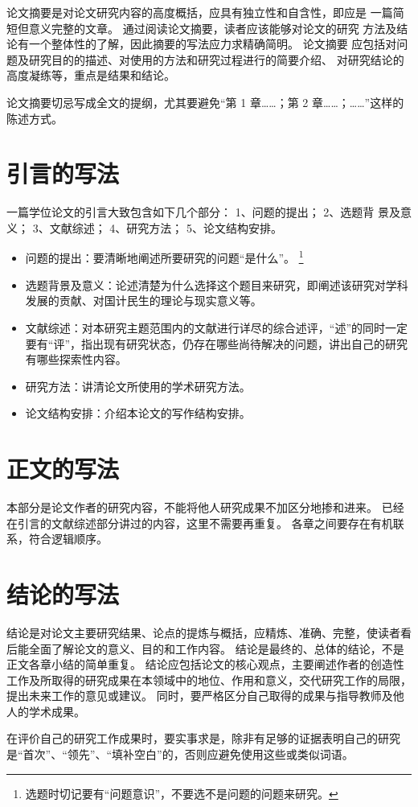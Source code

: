 论文摘要是对论文研究内容的高度概括，应具有独立性和自含性，即应是 一篇简短但意义完整的文章。
通过阅读论文摘要，读者应该能够对论文的研究 方法及结论有一个整体性的了解，因此摘要的写法应力求精确简明。
论文摘要 应包括对问题及研究目的的描述、对使用的方法和研究过程进行的简要介绍、 对研究结论的高度凝练等，重点是结果和结论。

论文摘要切忌写成全文的提纲，尤其要避免“第 1 章……；第 2 章……；……”这样的陈述方式。



\section{引言的写法}

一篇学位论文的引言大致包含如下几个部分：
1、问题的提出；
2、选题背 景及意义；
3、文献综述；
4、研究方法；
5、论文结构安排。
\begin{itemize}
  \item 问题的提出：要清晰地阐述所要研究的问题“是什么”。
    \footnote{选题时切记要有“问题意识”，不要选不是问题的问题来研究。}
  \item 选题背景及意义：论述清楚为什么选择这个题目来研究，即阐述该研究对学科发展的贡献、对国计民生的理论与现实意义等。
  \item 文献综述：对本研究主题范围内的文献进行详尽的综合述评，“述”的同时一定要有“评”，指出现有研究状态，仍存在哪些尚待解决的问题，讲出自己的研究有哪些探索性内容。
  \item 研究方法：讲清论文所使用的学术研究方法。
  \item 论文结构安排：介绍本论文的写作结构安排。
\end{itemize}



\section{正文的写法}

本部分是论文作者的研究内容，不能将他人研究成果不加区分地掺和进来。
已经在引言的文献综述部分讲过的内容，这里不需要再重复。
各章之间要存在有机联系，符合逻辑顺序。



\section{结论的写法}

结论是对论文主要研究结果、论点的提炼与概括，应精炼、准确、完整，使读者看后能全面了解论文的意义、目的和工作内容。
结论是最终的、总体的结论，不是正文各章小结的简单重复。
结论应包括论文的核心观点，主要阐述作者的创造性工作及所取得的研究成果在本领域中的地位、作用和意义，交代研究工作的局限，提出未来工作的意见或建议。
同时，要严格区分自己取得的成果与指导教师及他人的学术成果。

在评价自己的研究工作成果时，要实事求是，除非有足够的证据表明自己的研究是“首次”、“领先”、“填补空白”的，否则应避免使用这些或类似词语。

\fi
